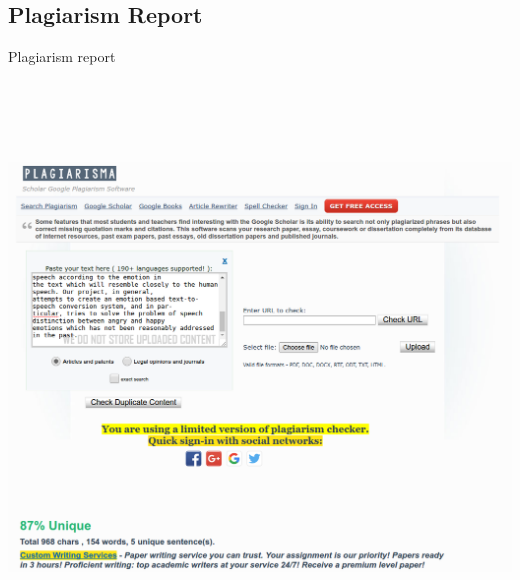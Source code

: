 \documentclass[oneside,a4paper,12pt]{book}
\begin{document}
\begin{appendices}
\chapter{Plagiarism Report}
Plagiarism report \\
\includegraphics[width=400pt,height=450pt]{plagiarism.png}


\end{appendices}
\end{document}
